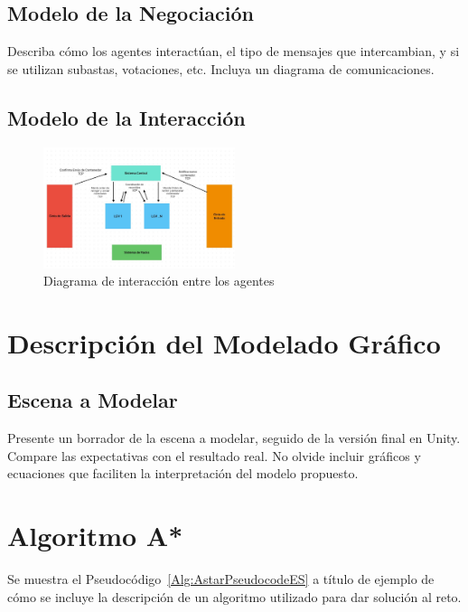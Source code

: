 \documentclass[sjournal]{IEEEtran}
\begin{document}
\subsection{Modelo de la Negociación}
Describa cómo los agentes interactúan, el tipo de mensajes que intercambian, y si se utilizan subastas, votaciones, etc. Incluya un diagrama de comunicaciones.

\subsection{Modelo de la Interacción}
\begin{figure}[h!]
    \centering
    \includegraphics[width=0.5\textwidth]{modeloInteraccion.jpeg}
    \caption{Diagrama de interacción entre los agentes}
    \label{fig:modeloInteraccion}
\end{figure}
\section{Descripción del Modelado Gráfico}
\subsection{Escena a Modelar}
Presente un borrador de la escena a modelar, seguido de la versión final en Unity. Compare las expectativas con el resultado real. No olvide incluir gráficos y ecuaciones que faciliten la interpretación del modelo propuesto.

\section{Algoritmo A*}

Se muestra el Pseudocódigo~\ref{Alg:AstarPseudocodeES} a título de ejemplo de cómo se incluye la descripción de un algoritmo utilizado para dar solución al reto.
\end{document}
